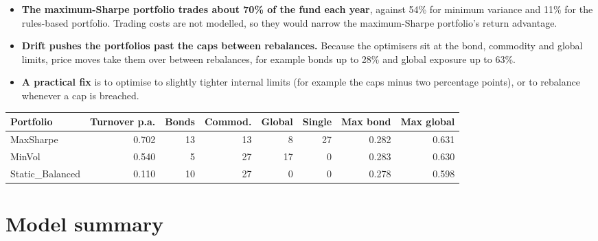 \documentclass[11pt,preprint]{elsarticle}
\let\origtable\table
\let\endorigtable\endtable
\renewenvironment{table}[1][2] {
    \expandafter\origtable\expandafter[H]
} {
    \endorigtable
}
\numberwithin{equation}{section}
\numberwithin{figure}{section}
\numberwithin{table}{section}
\def\tightlist{} %
\begin{document}
\begin{itemize}
\tightlist
\item
  \textbf{The maximum-Sharpe portfolio trades about 70\% of the fund
  each year}, against 54\% for minimum variance and 11\% for the
  rules-based portfolio. Trading costs are not modelled, so they would
  narrow the maximum-Sharpe portfolio's return advantage.
\item
  \textbf{Drift pushes the portfolios past the caps between rebalances.}
  Because the optimisers sit at the bond, commodity and global limits,
  price moves take them over between rebalances, for example bonds up to
  28\% and global exposure up to 63\%.
\item
  \textbf{A practical fix} is to optimise to slightly tighter internal
  limits (for example the caps minus two percentage points), or to
  rebalance whenever a cap is breached.
\end{itemize}

\begin{table}[!htbp]
\centering
\caption{Annual turnover, number of months (of 81) in which drifted weights breach each cap, and the highest drifted bond and global weights} 
\label{tab:trade}
\begingroup\scriptsize
\begin{tabular}{lrrrrrrr}
  \hline
Portfolio & Turnover p.a. & Bonds & Commod. & Global & Single & Max bond & Max global \\ 
  \hline
MaxSharpe & 0.702 &   13 &   13 &    8 &   27 & 0.282 & 0.631 \\ 
  MinVol & 0.540 &    5 &   27 &   17 &    0 & 0.283 & 0.630 \\ 
  Static\_Balanced & 0.110 &   10 &   27 &    0 &    0 & 0.278 & 0.598 \\ 
   \hline
\end{tabular}
\endgroup
\end{table}

\section{\texorpdfstring{Model summary
\label{Summary}}{Model summary }}\label{model-summary}
\end{document}
